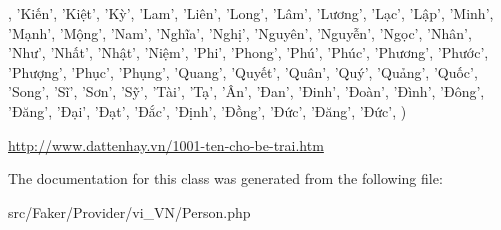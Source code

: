 \begin{DoxyCode}
      , \textcolor{stringliteral}{'Kiến'}, \textcolor{stringliteral}{'Kiệt'}, \textcolor{stringliteral}{'Kỳ'},
        \textcolor{stringliteral}{'Lam'}, \textcolor{stringliteral}{'Liên'}, \textcolor{stringliteral}{'Long'}, \textcolor{stringliteral}{'Lâm'}, \textcolor{stringliteral}{'Lương'}, \textcolor{stringliteral}{'Lạc'}, \textcolor{stringliteral}{'Lập'},
        \textcolor{stringliteral}{'Minh'}, \textcolor{stringliteral}{'Mạnh'}, \textcolor{stringliteral}{'Mộng'},
        \textcolor{stringliteral}{'Nam'}, \textcolor{stringliteral}{'Nghĩa'}, \textcolor{stringliteral}{'Nghị'}, \textcolor{stringliteral}{'Nguyên'}, \textcolor{stringliteral}{'Nguyễn'}, \textcolor{stringliteral}{'Ngọc'}, \textcolor{stringliteral}{'Nhân'}, \textcolor{stringliteral}{'Như'}, \textcolor{stringliteral}{'Nhất'}, \textcolor{stringliteral}{'Nhật'}, \textcolor{stringliteral}{'Niệm'},
        \textcolor{stringliteral}{'Phi'}, \textcolor{stringliteral}{'Phong'}, \textcolor{stringliteral}{'Phú'}, \textcolor{stringliteral}{'Phúc'}, \textcolor{stringliteral}{'Phương'}, \textcolor{stringliteral}{'Phước'}, \textcolor{stringliteral}{'Phượng'}, \textcolor{stringliteral}{'Phục'}, \textcolor{stringliteral}{'Phụng'},
        \textcolor{stringliteral}{'Quang'}, \textcolor{stringliteral}{'Quyết'}, \textcolor{stringliteral}{'Quân'}, \textcolor{stringliteral}{'Quý'}, \textcolor{stringliteral}{'Quảng'}, \textcolor{stringliteral}{'Quốc'},
        \textcolor{stringliteral}{'Song'}, \textcolor{stringliteral}{'Sĩ'}, \textcolor{stringliteral}{'Sơn'}, \textcolor{stringliteral}{'Sỹ'},
        \textcolor{stringliteral}{'Tài'}, \textcolor{stringliteral}{'Tạ'},
        \textcolor{stringliteral}{'Ân'},
        \textcolor{stringliteral}{'Đan'}, \textcolor{stringliteral}{'Đinh'}, \textcolor{stringliteral}{'Đoàn'}, \textcolor{stringliteral}{'Đình'}, \textcolor{stringliteral}{'Đông'}, \textcolor{stringliteral}{'Đăng'}, \textcolor{stringliteral}{'Đại'}, \textcolor{stringliteral}{'Đạt'}, \textcolor{stringliteral}{'Đắc'}, \textcolor{stringliteral}{'Định'}, \textcolor{stringliteral}{'Đồng'}, \textcolor{stringliteral}{'Đức'}, \textcolor{stringliteral}{'Đăng'}, \textcolor{stringliteral}{
      'Đức'},
    )
\end{DoxyCode}
\hyperlink{}{http\+://www.\+dattenhay.\+vn/1001-\/ten-\/cho-\/be-\/trai.\+htm}

The documentation for this class was generated from the following file\+:\begin{DoxyCompactItemize}
\item 
src/\+Faker/\+Provider/vi\+\_\+\+V\+N/Person.\+php\end{DoxyCompactItemize}
